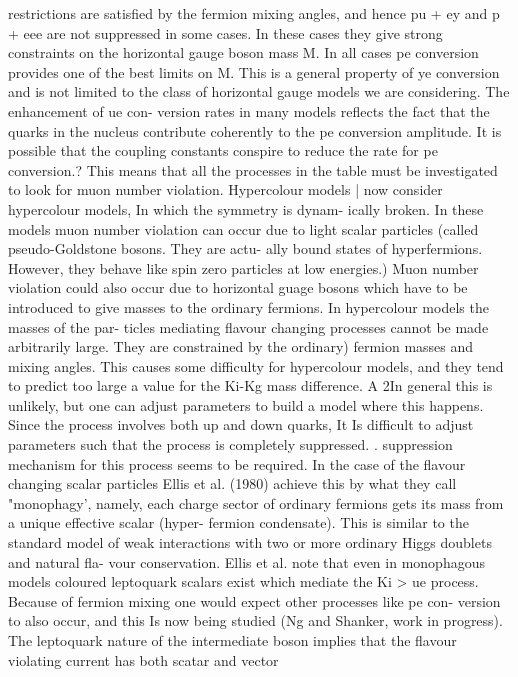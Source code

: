 \documentclass[twoside]{article}
\begin{document}
{{{{{{{{{{{{{{restrictions are satisfied by the fermion mixing angles, and hence
pu + ey and p + eee are not suppressed in some cases. In these cases
they give strong constraints on the horizontal gauge boson mass M. In
all cases pe conversion provides one of the best limits on M. This is
a general property of ye conversion and is not limited to the class of
horizontal gauge models we are considering. The enhancement of ue con-
version rates in many models reflects the fact that the quarks in the
nucleus contribute coherently to the pe conversion amplitude. It is
possible that the coupling constants conspire to reduce the rate for pe
conversion.? This means that all the processes in the table must be
investigated to look for muon number violation.
Hypercolour models
| now consider hypercolour models, In which the symmetry is dynam-
ically broken. In these models muon number violation can occur due to
light scalar particles (called pseudo-Goldstone bosons. They are actu-
ally bound states of hyperfermions. However, they behave like spin zero
particles at low energies.) Muon number violation could also occur due
to horizontal guage bosons which have to be introduced to give masses
to the ordinary fermions. In hypercolour models the masses of the par-
ticles mediating flavour changing processes cannot be made arbitrarily
large. They are constrained by the {ordinary) fermion masses and mixing
angles. This causes some difficulty for hypercolour models, and they
tend to predict too large a value for the Ki-Kg mass difference. A
2In general this is unlikely, but one can adjust parameters to build a
model where this happens. Since the process involves both up and down
quarks, It Is difficult to adjust parameters such that the process is
completely suppressed.
. 
suppression mechanism for this process seems to be required. In the
case of the flavour changing scalar particles Ellis et al. (1980)
achieve this by what they call "monophagy', namely, each charge sector
of ordinary fermions gets its mass from a unique effective scalar (hyper-
fermion condensate). This is similar to the standard model of weak
interactions with two or more ordinary Higgs doublets and natural fla-
vour conservation. Ellis et al. note that even in monophagous models
coloured leptoquark scalars exist which mediate the Ki > ue process.
Because of fermion mixing one would expect other processes like pe con-
version to also occur, and this Is now being studied (Ng and Shanker,
work in progress). The leptoquark nature of the intermediate boson
implies that the flavour violating current has both scatar and vector
}}}}}}}}}}}}}}}
\end{document}
